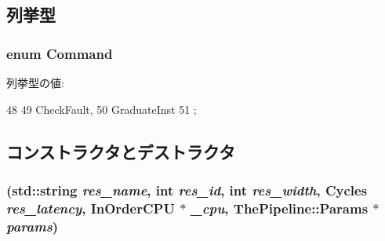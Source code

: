 \subsection{列挙型}
\hypertarget{classGraduationUnit_a2afce0a47a93eee73a314d53e4890153}{
\subsubsection[{Command}]{\setlength{\rightskip}{0pt plus 5cm}enum {\bf Command}}}
\label{classGraduationUnit_a2afce0a47a93eee73a314d53e4890153}
\begin{Desc}
\item[列挙型の値: ]\par
\begin{description}
\item[{\em 
\hypertarget{classGraduationUnit_a2afce0a47a93eee73a314d53e4890153af5078e6f13b238ab8060c96938d6072b}{
CheckFault}
\label{classGraduationUnit_a2afce0a47a93eee73a314d53e4890153af5078e6f13b238ab8060c96938d6072b}
}]\item[{\em 
\hypertarget{classGraduationUnit_a2afce0a47a93eee73a314d53e4890153a0dbb578317cd51936a80b515cd969112}{
GraduateInst}
\label{classGraduationUnit_a2afce0a47a93eee73a314d53e4890153a0dbb578317cd51936a80b515cd969112}
}]\end{description}
\end{Desc}




\begin{DoxyCode}
48                  {
49         CheckFault,
50         GraduateInst
51     };
\end{DoxyCode}


\subsection{コンストラクタとデストラクタ}
\hypertarget{classGraduationUnit_a833d5b53b32caa0573f9df673f7348c4}{
\subsubsection[{GraduationUnit}]{ (std::string {\em res\_\-name}, \/  int {\em res\_\-id}, \/  int {\em res\_\-width}, \/  {\bf Cycles} {\em res\_\-latency}, \/  {\bf InOrderCPU} $\ast$ {\em \_\-cpu}, \/  {\bf ThePipeline::Params} $\ast$ {\em params})}}
\label{classGraduationUnit_a833d5b53b32caa0573f9df673f7348c4}



